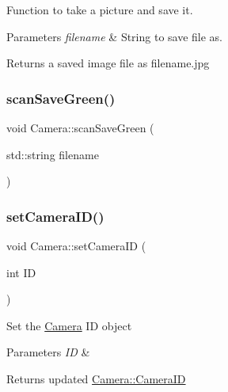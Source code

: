 Function to take a picture and save it.


\begin{DoxyParams}{Parameters}
{\em filename} & String to save file as.\\
\hline
\end{DoxyParams}
\begin{DoxyReturn}{Returns}
a saved image file as filename.\+jpg 
\end{DoxyReturn}
\mbox{\label{classCamera_a06cf0ed4a2b79d95637ddeb3301d3856}} 
\subsubsection{\texorpdfstring{scan\+Save\+Green()}{scanSaveGreen()}}
{\footnotesize\ttfamily void Camera\+::scan\+Save\+Green (\begin{DoxyParamCaption}\item[{std\+::string}]{filename }\end{DoxyParamCaption})}

\mbox{\label{classCamera_af699a1dad54f8631e862b6f7703e48d3}} 
\subsubsection{\texorpdfstring{set\+Camera\+I\+D()}{setCameraID()}}
{\footnotesize\ttfamily void Camera\+::set\+Camera\+ID (\begin{DoxyParamCaption}\item[{int}]{ID }\end{DoxyParamCaption})}

Set the \hyperlink{classCamera}{Camera} ID object


\begin{DoxyParams}{Parameters}
{\em ID} & \\
\hline
\end{DoxyParams}
\begin{DoxyReturn}{Returns}
updated \hyperlink{classCamera_a96c19741cb6ba7a897ca90746e8b8918}{Camera\+::\+Camera\+ID} 
\end{DoxyReturn}
\mbox{\label{classCamera_aef0a4ebb556d5a2a0f13e5d120c05259}} 
